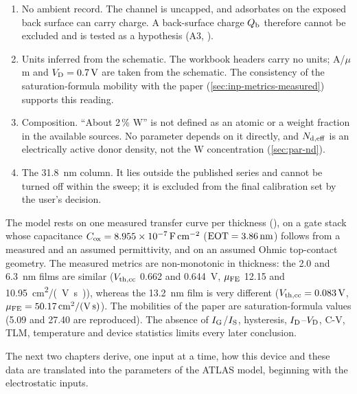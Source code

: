 \begin{enumerate}
        A thickness error of the order of a nanometre at \SI{6.3}{nm} is therefore an open hypothesis (tested as A1,
        , in \cref{ch:6p3}).
  \item No ambient record. The channel is uncapped, and adsorbates on the exposed back surface can carry charge. A
        back-surface charge $Q_{\mathrm{b}}$ therefore cannot be excluded and is tested as a hypothesis (A3, ).
  \item Units inferred from the schematic. The workbook headers carry no units; A/$\mu$m and $V_{\mathrm{D}} = \SI{0.7}{V}$ are
        taken from the schematic. The consistency of the saturation-formula mobility with the paper
        (\cref{sec:inp-metrics-measured}) supports this reading.
  \item Composition. ``About 2\,\% W'' is not defined as an atomic or a weight fraction in the available sources. No
        parameter depends on it directly, and $N_{\mathrm{d,eff}}$ is an electrically active donor density, not the W
        concentration (\cref{sec:par-nd}).
  \item The \SI{31.8}{nm} column. It lies outside the published series and cannot be turned off within the sweep; it is
        excluded from the final calibration set by the user's decision.
\end{enumerate}

\begin{keyresult}
The model rests on one measured transfer curve per thickness (\evDATA), on a gate stack whose capacitance
$C_{\mathrm{ox}} = \SI{8.955e-7}{\farad\per\centi\metre\squared}$ ($\mathrm{EOT} = \SI{3.86}{nm}$) follows from a measured \HfO{} and an
assumed \AlO{} permittivity, and on an assumed Ohmic top-contact geometry. The measured metrics are non-monotonic in
thickness: the 2.0 and \SI{6.3}{nm} films are similar ($V_{\mathrm{th,cc}}$ 0.662 and \SI{0.644}{V}, $\mu_{\mathrm{FE}}$ 12.15 and
\SI{10.95}{cm^2/(V.s)}), whereas the \SI{13.2}{nm} film is very different ($V_{\mathrm{th,cc}} = \SI{0.083}{V}$,
$\mu_{\mathrm{FE}} = \SI{50.17}{cm^2/(V.s)}$). The mobilities of the paper are saturation-formula values (5.09 and 27.40 are
reproduced). The absence of $I_{\mathrm{G}}$/$I_{\mathrm{S}}$, hysteresis, $I_{\mathrm{D}}$--$V_{\mathrm{D}}$, C-V, TLM, temperature and device statistics limits
every later conclusion.
\end{keyresult}

The next two chapters derive, one input at a time, how this device and these data are translated into the parameters of
the ATLAS model, beginning with the electrostatic inputs.
